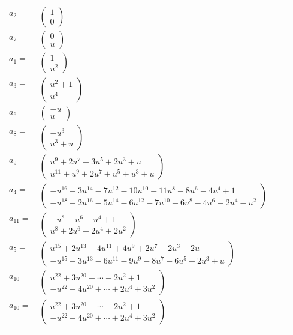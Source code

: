\documentclass[1p]{elsarticle_modified}
\theoremstyle{definition}
\begin{document}
\begin{tabular}{m{7pt} m{180pt} m{7pt} m{180pt} }
\flushright $a_{2}=$&$\begin{pmatrix}1\\0\end{pmatrix}$ \\
\flushright $a_{7}=$&$\begin{pmatrix}0\\u\end{pmatrix}$ \\
\flushright $a_{1}=$&$\begin{pmatrix}1\\u^2\end{pmatrix}$ \\
\flushright $a_{3}=$&$\begin{pmatrix}u^2+1\\u^4\end{pmatrix}$ \\
\flushright $a_{6}=$&$\begin{pmatrix}- u\\u\end{pmatrix}$ \\
\flushright $a_{8}=$&$\begin{pmatrix}- u^3\\u^3+u\end{pmatrix}$ \\
\flushright $a_{9}=$&$\begin{pmatrix}u^9+2 u^7+3 u^5+2 u^3+u\\u^{11}+u^9+2 u^7+u^5+u^3+u\end{pmatrix}$ \\
\flushright $a_{4}=$&$\begin{pmatrix}- u^{16}-3 u^{14}-7 u^{12}-10 u^{10}-11 u^8-8 u^6-4 u^4+1\\- u^{18}-2 u^{16}-5 u^{14}-6 u^{12}-7 u^{10}-6 u^8-4 u^6-2 u^4- u^2\end{pmatrix}$ \\
\flushright $a_{11}=$&$\begin{pmatrix}- u^8- u^6- u^4+1\\u^8+2 u^6+2 u^4+2 u^2\end{pmatrix}$ \\
\flushright $a_{5}=$&$\begin{pmatrix}u^{15}+2 u^{13}+4 u^{11}+4 u^9+2 u^7-2 u^3-2 u\\- u^{15}-3 u^{13}-6 u^{11}-9 u^9-8 u^7-6 u^5-2 u^3+u\end{pmatrix}$ \\
\flushright $a_{10}=$&$\begin{pmatrix}u^{22}+3 u^{20}+\cdots-2 u^2+1\\- u^{22}-4 u^{20}+\cdots+2 u^4+3 u^2\end{pmatrix}$\\ \flushright $a_{10}=$&$\begin{pmatrix}u^{22}+3 u^{20}+\cdots-2 u^2+1\\- u^{22}-4 u^{20}+\cdots+2 u^4+3 u^2\end{pmatrix}$\\&\end{tabular}
\end{document}
